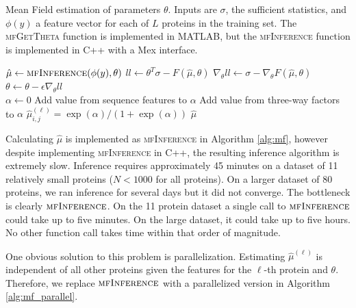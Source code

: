 \documentclass{article}
\begin{document}
\begin{algorithm}
\caption{Mean Field estimation of parameters $\theta$. Inputs are $\sigma$, the sufficient statistics, and $\phi(y)$ a feature vector for each of $L$ proteins in the training set. The \textsc{mfGetTheta} function is implemented in MATLAB, but the \textsc{mfInference} function is implemented in C++ with a Mex interface.}\label{alg:mf}
\begin{algorithmic}
		\State $\hat{\mu} \gets \Call{mfInference}{\phi(y), \theta}$ 
		\State $ll \gets \theta^T\sigma - F(\hat{\mu}, \theta)$ 
		\State $\nabla_\theta ll \gets \sigma - \nabla_\theta F(\hat{\mu}, \theta)$
		\State $\theta \gets \theta - \epsilon\nabla_\theta ll$
	\EndWhile
\EndFunction
\\
		 
					\State $\alpha \gets 0$
					\State Add value from sequence features to $\alpha$
						\State Add value from three-way factors to $\alpha$
					\EndFor
					\State $\hat{\mu}^{(\ell)}_{i,j} = \exp(\alpha)/(1 + \exp(\alpha))$
				\EndFor
			\EndFor
		\EndFor
	\EndFor
	\State \Return $\hat{\mu}$
\EndFunction
\end{algorithmic}
\end{algorithm}
Calculating $\hat{\mu}$ is implemented as \textsc{mfInference} in Algorithm \ref{alg:mf}, however despite implementing \textsc{mfInference} in C++, the resulting inference algorithm is extremely slow. Inference requires approximately 45 minutes on a dataset of 11 relatively small proteins ($N < 1000$ for all proteins). On a larger dataset of 80 proteins, we ran inference for several days but it did not converge. The bottleneck is clearly $\textsc{mfInference}$. On the 11 protein dataset a single call to $\textsc{mfInference}$ could take up to five minutes. On the large dataset, it could take up to five hours. No other function call takes time within that order of magnitude.

One obvious solution to this problem is parallelization. Estimating $\hat{\mu}^{(\ell)}$ is independent of all other proteins given the features for the $\ell$-th protein and $\theta$. Therefore, we replace $\textsc{mfInference}$ with a parallelized version in Algorithm \ref{alg:mf_parallel}.
\end{document}
